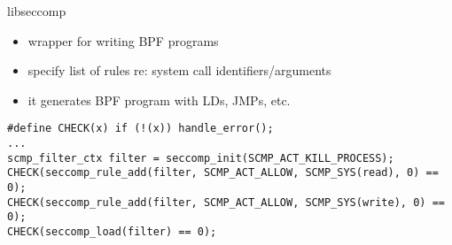 \begin{frame}[fragile]{libseccomp}
    \begin{itemize}
    \item wrapper for writing BPF programs
    \item specify list of rules re: system call identifiers/arguments
    \item it generates BPF program with LDs, JMPs, etc.
    \end{itemize}
\begin{Verbatim}[fontsize=\small]
#define CHECK(x) if (!(x)) handle_error();
...
scmp_filter_ctx filter = seccomp_init(SCMP_ACT_KILL_PROCESS);
CHECK(seccomp_rule_add(filter, SCMP_ACT_ALLOW, SCMP_SYS(read), 0) == 0);
CHECK(seccomp_rule_add(filter, SCMP_ACT_ALLOW, SCMP_SYS(write), 0) == 0);
CHECK(seccomp_load(filter) == 0);
\end{Verbatim}
\end{frame}
